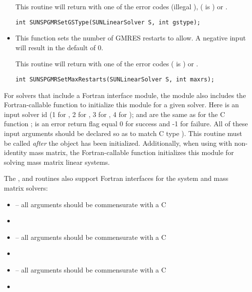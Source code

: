 \begin{itemize}
  This routine will return with one of the error codes
   (illegal ), 
  ( is ) or .
  
  \verb|int SUNSPGMRSetGSType(SUNLinearSolver S, int gstype);|



\item {}

  This function sets the number of GMRES restarts to 
  allow.  A negative input will result in the default of 0.

  This routine will return with one of the error codes
   ( is ) or .
  
  \verb|int SUNSPGMRSetMaxRestarts(SUNLinearSolver S, int maxrs);|

\end{itemize}
For solvers that include a Fortran interface module, the
{\sunlinsolspgmr} module also includes the Fortran-callable
function  to initialize
this {\sunlinsolspgmr} module for a given {\sundials} solver.
Here  is an input solver id (1 for {\cvode}, 2 for {\ida}, 3
for {\kinsol}, 4 for {\arkode});  and  are the
same as for the C function ;  is an error return
flag equal 0 for success and -1 for failure.  All of these input
arguments should be declared so as to match C type ).  This
routine must be called \emph{after} the {\nvector} object has been
initialized.  Additionally, when using {\arkode} with non-identity
mass matrix, the Fortran-callable
function  initializes this 
{\sunlinsolspgmr} module for solving mass matrix linear systems.

The ,  and
 routines also support Fortran interfaces
for the system and mass matrix solvers:
\begin{itemize}
\item {} -- all arguments
  should be commensurate with a C 
\item {}
\item {} -- all arguments
  should be commensurate with a C 
\item {}
\item {} -- all arguments
  should be commensurate with a C 
\item {}
\end{itemize}
